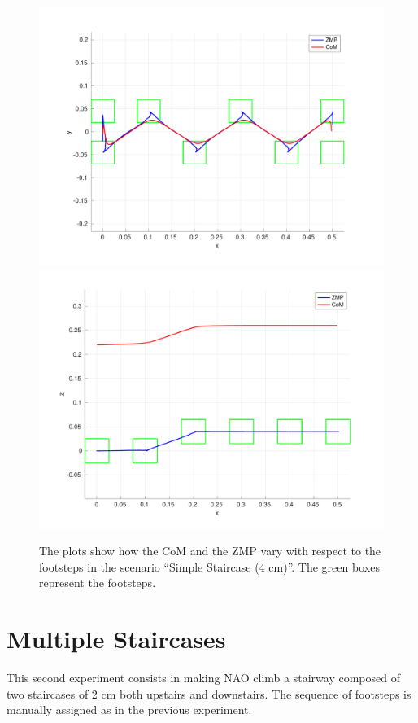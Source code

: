\begin{figure}
  \centering
  \includegraphics[width=\textwidth]
      {figures/experiments/simple-staircase/xy-plot-4cm.pdf}
  \includegraphics[width=\textwidth]
      {figures/experiments/simple-staircase/xz-plot-4cm.pdf}
  \caption{The plots show how the CoM and the ZMP vary with respect to the
		footsteps in the scenario ``Simple Staircase (4 cm)''.
    The green boxes represent the footsteps.}
  \label{fig:experiments:simple-staircase:comzmp}
\end{figure}

\section{Multiple Staircases}
This second experiment consists in making NAO climb a stairway composed of 
two staircases of 2 cm both upstairs and downstairs. The sequence of footsteps 
is manually assigned as in the previous experiment.

